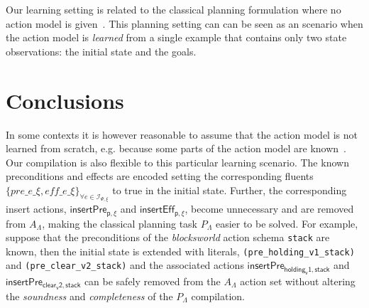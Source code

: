 \documentclass{article}
\begin{document}
Our learning setting is related to the classical planning formulation where no action model is given~\cite{SternJ17}. This planning setting can can be seen as an scenario when the action model is {\em learned} from a single example that contains only two state observations: the initial state and the goals.




\section{Conclusions}
\label{sec:conclusions}
In some contexts it is however reasonable to assume that the action model is not learned from scratch, e.g. because some parts of the action model are known~\cite{ZhuoNK13,sreedharan2018handling,pereira2018heuristic}. Our compilation is also flexible to this particular learning scenario. The known preconditions and effects are encoded setting the corresponding fluents $\{pre\_e\_\xi, eff\_e\_\xi\}_{\forall e\in{\mathcal I}_{\Psi,\xi}}$ to true in the initial state. Further, the corresponding insert actions, $\mathsf{insertPre_{p,\xi}}$ and $\mathsf{insertEff_{p,\xi}}$, become unnecessary and are removed from $A_{\Lambda}$, making the classical planning task $P_{\Lambda}$ easier to be solved. For example, suppose that the preconditions of the {\em blocksworld} action schema {\tt stack} are known, then the initial state is extended with literals, {\small\tt(pre\_holding\_v1\_stack)} and {\small\tt(pre\_clear\_v2\_stack)} and the associated actions $\mathsf{insertPre_{holding_v1,stack}}$ and $\mathsf{insertPre_{clear_v2,stack}}$ can be safely removed from the $A_{\Lambda}$ action set without altering the {\em soundness} and {\em completeness} of the $P_{\Lambda}$ compilation.



\end{document}
